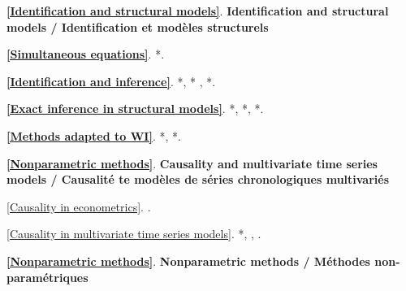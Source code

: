 \documentclass[titlepage,11pt,amstex]{article}
\begin{document}
\quad

\noindent \textbf{\ref{Identification and structural models}}. \textbf{%
Identification and structural models / Identification et mod\`{e}les
structurels}

\quad

\begin{description}
\item[\quad ] \textbf{\ref{Simultaneous equations}}. *\cite[Chapter 7]%
{Ullah(2004)}.

\item \textbf{\ref{Identification and inference}}. *\cite{Dufour(2003)}, *%
\cite{Stock-Wright-Yogo(2002)}, *\cite{Dufour(1997)}.

\item \textbf{\ref{Exact inference in structural models}}. *\cite%
{Dufour(1997)}, *\cite{Dufour-Jasiak(2001)}, *\cite{Dufour-Taamouti(2005)}.

\item \textbf{\ref{Methods adapted to WI}}. *\cite{Kleibergen(2002)}, *\cite%
{Moreira(2003)}.
\end{description}

\quad

\noindent \textbf{\ref{Nonparametric methods}}. \textbf{Causality and
multivariate time series models / Causalit\'{e} te mod\`{e}les de s\'{e}ries
chronologiques multivari\'{e}s}

\quad

\begin{description}
\item \ref{Causality in econometrics}. \cite{Causality in econometrics}. 
\cite{Pearl(2000)}

\item \ref{Causality in multivariate time series models}. *\cite%
{Dufour-Renault(1998)}, \cite{Dufour-Pelletier-Renault(2006)}, \cite%
{Boudjellaba-Dufour-Roy(1992)}.
\end{description}

\quad

\noindent \textbf{\ref{Nonparametric methods}}. \textbf{Nonparametric
methods / M\'{e}thodes non-param\'{e}triques}

\textbf{\quad }
\end{document}
